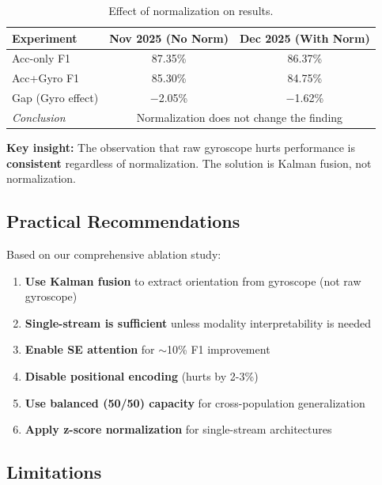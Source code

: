 \documentclass{article}
\begin{document}
\begin{table}[htbp]
    \centering
    \caption{Effect of normalization on results.}
    \label{tab:norm_comparison}
    \begin{tabular}{lcc}
        \toprule
        \textbf{Experiment} & \textbf{Nov 2025 (No Norm)} & \textbf{Dec 2025 (With Norm)} \\
        \midrule
        Acc-only F1 & 87.35\% & 86.37\% \\
        Acc+Gyro F1 & 85.30\% & 84.75\% \\
        Gap (Gyro effect) & $-$2.05\% & $-$1.62\% \\
        \midrule
        \textit{Conclusion} & \multicolumn{2}{c}{Normalization does not change the finding} \\
        \bottomrule
    \end{tabular}
\end{table}

\textbf{Key insight:} The observation that raw gyroscope hurts performance is \textbf{consistent} regardless of normalization. The solution is Kalman fusion, not normalization.

\subsection{Practical Recommendations}

Based on our comprehensive ablation study:

\begin{enumerate}
    \item \textbf{Use Kalman fusion} to extract orientation from gyroscope (not raw gyroscope)
    \item \textbf{Single-stream is sufficient} unless modality interpretability is needed
    \item \textbf{Enable SE attention} for $\sim$10\% F1 improvement
    \item \textbf{Disable positional encoding} (hurts by 2-3\%)
    \item \textbf{Use balanced (50/50) capacity} for cross-population generalization
    \item \textbf{Apply z-score normalization} for single-stream architectures
\end{enumerate}

\subsection{Limitations}
\end{document}
